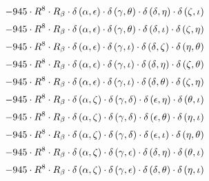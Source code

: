 \begin{subequations}
\begin{gather}
 \\[0.2em] \notag 		 - 945 \cdot R^{8} \cdot R_{\beta{}} \cdot \delta{}\left(\alpha{}, \epsilon{}\right) \cdot \delta{}\left(\gamma{}, \theta{}\right) \cdot \delta{}\left(\delta{}, \eta{}\right) \cdot \delta{}\left(\zeta{}, \iota{}\right) 
 \\[0.2em] \notag 		 - 945 \cdot R^{8} \cdot R_{\beta{}} \cdot \delta{}\left(\alpha{}, \epsilon{}\right) \cdot \delta{}\left(\gamma{}, \theta{}\right) \cdot \delta{}\left(\delta{}, \iota{}\right) \cdot \delta{}\left(\zeta{}, \eta{}\right) 
 \\[0.2em] \notag 		 - 945 \cdot R^{8} \cdot R_{\beta{}} \cdot \delta{}\left(\alpha{}, \epsilon{}\right) \cdot \delta{}\left(\gamma{}, \iota{}\right) \cdot \delta{}\left(\delta{}, \zeta{}\right) \cdot \delta{}\left(\eta{}, \theta{}\right) 
 \\[0.2em] \notag 		 - 945 \cdot R^{8} \cdot R_{\beta{}} \cdot \delta{}\left(\alpha{}, \epsilon{}\right) \cdot \delta{}\left(\gamma{}, \iota{}\right) \cdot \delta{}\left(\delta{}, \eta{}\right) \cdot \delta{}\left(\zeta{}, \theta{}\right) 
 \\[0.2em] \notag 		 - 945 \cdot R^{8} \cdot R_{\beta{}} \cdot \delta{}\left(\alpha{}, \epsilon{}\right) \cdot \delta{}\left(\gamma{}, \iota{}\right) \cdot \delta{}\left(\delta{}, \theta{}\right) \cdot \delta{}\left(\zeta{}, \eta{}\right) 
 \\[0.2em] \notag 		 - 945 \cdot R^{8} \cdot R_{\beta{}} \cdot \delta{}\left(\alpha{}, \zeta{}\right) \cdot \delta{}\left(\gamma{}, \delta{}\right) \cdot \delta{}\left(\epsilon{}, \eta{}\right) \cdot \delta{}\left(\theta{}, \iota{}\right) 
 \\[0.2em] \notag 		 - 945 \cdot R^{8} \cdot R_{\beta{}} \cdot \delta{}\left(\alpha{}, \zeta{}\right) \cdot \delta{}\left(\gamma{}, \delta{}\right) \cdot \delta{}\left(\epsilon{}, \theta{}\right) \cdot \delta{}\left(\eta{}, \iota{}\right) 
 \\[0.2em] \notag 		 - 945 \cdot R^{8} \cdot R_{\beta{}} \cdot \delta{}\left(\alpha{}, \zeta{}\right) \cdot \delta{}\left(\gamma{}, \delta{}\right) \cdot \delta{}\left(\epsilon{}, \iota{}\right) \cdot \delta{}\left(\eta{}, \theta{}\right) 
 \\[0.2em] \notag 		 - 945 \cdot R^{8} \cdot R_{\beta{}} \cdot \delta{}\left(\alpha{}, \zeta{}\right) \cdot \delta{}\left(\gamma{}, \epsilon{}\right) \cdot \delta{}\left(\delta{}, \eta{}\right) \cdot \delta{}\left(\theta{}, \iota{}\right) 
 \\[0.2em] \notag 		 - 945 \cdot R^{8} \cdot R_{\beta{}} \cdot \delta{}\left(\alpha{}, \zeta{}\right) \cdot \delta{}\left(\gamma{}, \epsilon{}\right) \cdot \delta{}\left(\delta{}, \theta{}\right) \cdot \delta{}\left(\eta{}, \iota{}\right) 

\end{gather}
\end{subequations}
